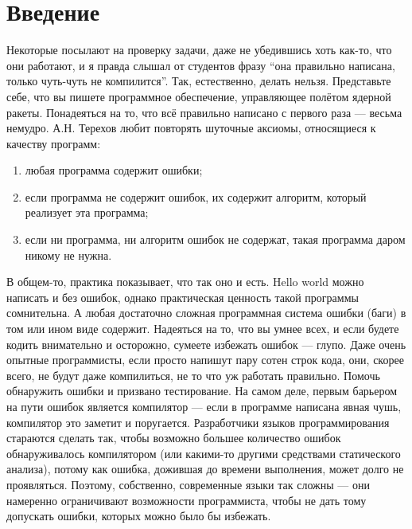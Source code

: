 \documentclass{../../text-style}
\begin{document}
\maketitle
\thispagestyle{empty}

\section{Введение}

Некоторые посылают на проверку задачи, даже не убедившись хоть как-то, что они работают, и я правда слышал от студентов фразу \enquote{она правильно написана, только чуть-чуть не компилится}. Так, естественно, делать нельзя. Представьте себе, что вы пишете программное обеспечение, управляющее полётом ядерной ракеты. Понадеяться на то, что всё правильно написано с первого раза --- весьма немудро. А.Н. Терехов любит повторять шуточные аксиомы, относящиеся к качеству программ:

\begin{enumerate}
    \item любая программа содержит ошибки;
    \item если программа не содержит ошибок, их содержит алгоритм, который реализует эта программа;
    \item если ни программа, ни алгоритм ошибок не содержат, такая программа даром никому не нужна.
\end{enumerate}

В общем-то, практика показывает, что так оно и есть. Hello world можно написать и без ошибок, однако практическая ценность такой программы сомнительна. А любая достаточно сложная программная система ошибки (баги) в том или ином виде содержит. Надеяться на то, что вы умнее всех, и если будете кодить внимательно и осторожно, сумеете избежать ошибок --- глупо. Даже очень опытные программисты, если просто напишут пару сотен строк кода, они, скорее всего, не будут даже компилиться, не то что уж работать правильно. Помочь обнаружить ошибки и призвано тестирование. На самом деле, первым барьером на пути ошибок является компилятор --- если в программе написана явная чушь, компилятор это заметит и поругается. Разработчики языков программирования стараются сделать так, чтобы возможно большее количество ошибок обнаруживалось компилятором (или какими-то другими средствами статического анализа), потому как ошибка, дожившая до времени выполнения, может долго не проявляться. Поэтому, собственно, современные языки так сложны --- они намеренно ограничивают возможности программиста, чтобы не дать тому допускать ошибки, которых можно было бы избежать.
\end{document}
